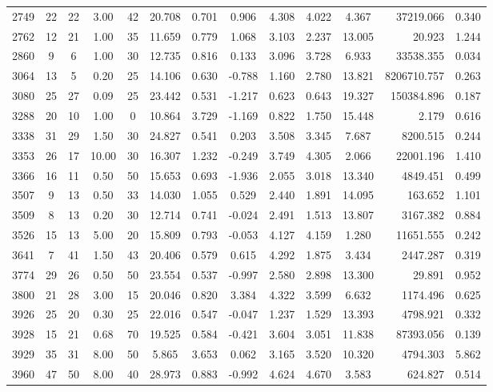 \documentclass[mnsc]{informs3}
\begin{document}
\begin{APPENDICES}
\begin{longtable}{cccccccccccrc}
2749 & 22 & 22 & 3.00 & 42 & 20.708 & 0.701 & 0.906 & 4.308 & 4.022 & 4.367 & 37219.066 & 0.340 \\
2762 & 12 & 21 & 1.00 & 35 & 11.659 & 0.779 & 1.068 & 3.103 & 2.237 & 13.005 & 20.923 & 1.244 \\
2860 & 9 & 6 & 1.00 & 30 & 12.735 & 0.816 & 0.133 & 3.096 & 3.728 & 6.933 & 33538.355 & 0.034 \\
3064 & 13 & 5 & 0.20 & 25 & 14.106 & 0.630 & -0.788 & 1.160 & 2.780 & 13.821 & 8206710.757 & 0.263 \\
3080 & 25 & 27 & 0.09 & 25 & 23.442 & 0.531 & -1.217 & 0.623 & 0.643 & 19.327 & 150384.896 & 0.187 \\
3288 & 20 & 10 & 1.00 & 0 & 10.864 & 3.729 & -1.169 & 0.822 & 1.750 & 15.448 & 2.179 & 0.616 \\
3338 & 31 & 29 & 1.50 & 30 & 24.827 & 0.541 & 0.203 & 3.508 & 3.345 & 7.687 & 8200.515 & 0.244 \\
3353 & 26 & 17 & 10.00 & 30 & 16.307 & 1.232 & -0.249 & 3.749 & 4.305 & 2.066 & 22001.196 & 1.410 \\
3366 & 16 & 11 & 0.50 & 50 & 15.653 & 0.693 & -1.936 & 2.055 & 3.018 & 13.340 & 4849.451 & 0.499 \\
3507 & 9 & 13 & 0.50 & 33 & 14.030 & 1.055 & 0.529 & 2.440 & 1.891 & 14.095 & 163.652 & 1.101 \\
3509 & 8 & 13 & 0.20 & 30 & 12.714 & 0.741 & -0.024 & 2.491 & 1.513 & 13.807 & 3167.382 & 0.884 \\
3526 & 15 & 13 & 5.00 & 20 & 15.809 & 0.793 & -0.053 & 4.127 & 4.159 & 1.280 & 11651.555 & 0.242 \\
3641 & 7 & 41 & 1.50 & 43 & 20.406 & 0.579 & 0.615 & 4.292 & 1.875 & 3.434 & 2447.287 & 0.319 \\
3774 & 29 & 26 & 0.50 & 50 & 23.554 & 0.537 & -0.997 & 2.580 & 2.898 & 13.300 & 29.891 & 0.952 \\
3800 & 21 & 28 & 3.00 & 15 & 20.046 & 0.820 & 3.384 & 4.322 & 3.599 & 6.632 & 1174.496 & 0.625 \\
3926 & 25 & 20 & 0.30 & 25 & 22.016 & 0.547 & -0.047 & 1.237 & 1.529 & 13.393 & 4798.921 & 0.332 \\
3928 & 15 & 21 & 0.68 & 70 & 19.525 & 0.584 & -0.421 & 3.604 & 3.051 & 11.838 & 87393.056 & 0.139 \\
3929 & 35 & 31 & 8.00 & 50 & 5.865 & 3.653 & 0.062 & 3.165 & 3.520 & 10.320 & 4794.303 & 5.862 \\
3960 & 47 & 50 & 8.00 & 40 & 28.973 & 0.883 & -0.992 & 4.624 & 4.670 & 3.583 & 624.827 & 0.514 \\

\end{longtable}
\end{APPENDICES}
\end{document}
